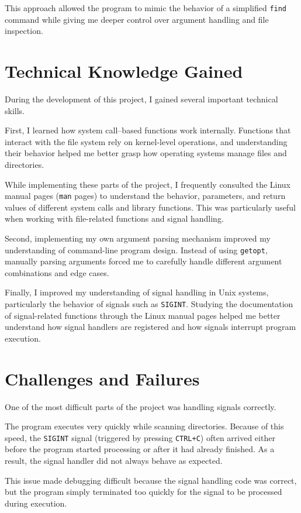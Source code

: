 \documentclass[12pt]{article}
\begin{document}
This approach allowed the program to mimic the behavior of a simplified \texttt{find} command while giving me deeper control over argument handling and file inspection.

\section{Technical Knowledge Gained}

During the development of this project, I gained several important technical skills.

First, I learned how system call--based functions work internally. Functions that interact with the file system rely on kernel-level operations, and understanding their behavior helped me better grasp how operating systems manage files and directories.

While implementing these parts of the project, I frequently consulted the Linux manual pages (\texttt{man} pages) to understand the behavior, parameters, and return values of different system calls and library functions. This was particularly useful when working with file-related functions and signal handling.

Second, implementing my own argument parsing mechanism improved my understanding of command-line program design. Instead of using \texttt{getopt}, manually parsing arguments forced me to carefully handle different argument combinations and edge cases.

Finally, I improved my understanding of signal handling in Unix systems, particularly the behavior of signals such as \texttt{SIGINT}. Studying the documentation of signal-related functions through the Linux manual pages helped me better understand how signal handlers are registered and how signals interrupt program execution.

\section{Challenges and Failures}

One of the most difficult parts of the project was handling signals correctly.

The program executes very quickly while scanning directories. Because of this speed, the \texttt{SIGINT} signal (triggered by pressing \texttt{CTRL+C}) often arrived either before the program started processing or after it had already finished. As a result, the signal handler did not always behave as expected.

This issue made debugging difficult because the signal handling code was correct, but the program simply terminated too quickly for the signal to be processed during execution.
\end{document}

